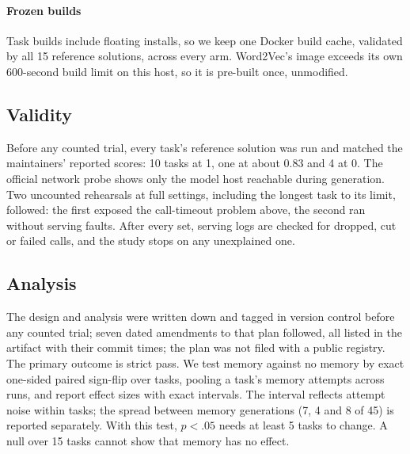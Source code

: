 \paragraph{Frozen builds} Task builds include floating installs, so we keep one Docker build cache, validated by all 15 reference solutions, across every arm. Word2Vec's image exceeds its own 600-second build limit on this host, so it is pre-built once, unmodified.

\subsection{Validity}
\label{sec:method-validity}
Before any counted trial, every task's reference solution was run and matched the maintainers' reported scores: 10 tasks at 1, one at about 0.83 and 4 at 0.
The official network probe shows only the model host reachable during generation.
Two uncounted rehearsals at full settings, including the longest task to its limit, followed: the first exposed the call-timeout problem above, the second ran without serving faults. After every set, serving logs are checked for dropped, cut or failed calls, and the study stops on any unexplained one.

\subsection{Analysis}
The design and analysis were written down and tagged in version control before any counted trial; seven dated amendments to that plan followed, all listed in the artifact with their commit times; the plan was not filed with a public registry.
The primary outcome is strict pass.
We test memory against no memory by exact one-sided paired sign-flip over tasks, pooling a task's memory attempts across runs, and report effect sizes with exact intervals. The interval reflects attempt noise within tasks; the spread between memory generations (7, 4 and 8 of 45) is reported separately.
With this test, $p<.05$ needs at least 5 tasks to change. A null over 15 tasks cannot show that memory has no effect.

